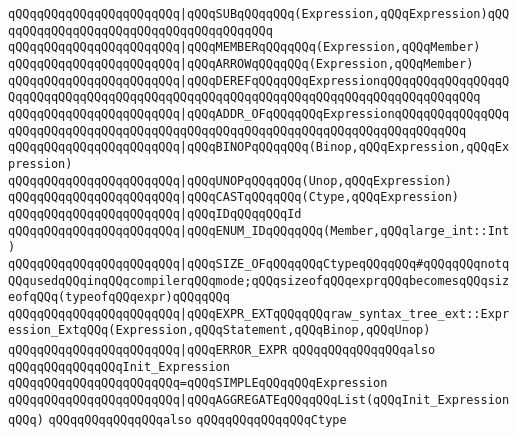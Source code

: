 \verb|qQQqqQQqqQQqqQQqqQQqqQQq|\verb#|qQQqSUBqQQqqQQq(Expression,qQQqExpression)qQQqqQQqqQQqqQQqqQQqqQQqqQQqqQQqqQQqqQQq#\newline
\verb|qQQqqQQqqQQqqQQqqQQqqQQq|\verb#|qQQqMEMBERqQQqqQQq(Expression,qQQqMember)#\newline
\verb|qQQqqQQqqQQqqQQqqQQqqQQq|\verb#|qQQqARROWqQQqqQQq(Expression,qQQqMember)#\newline
\verb|qQQqqQQqqQQqqQQqqQQqqQQq|\verb#|qQQqDEREFqQQqqQQqExpressionqQQqqQQqqQQqqQQqqQQqqQQqqQQqqQQqqQQqqQQqqQQqqQQqqQQqqQQqqQQqqQQqqQQqqQQqqQQqqQQqqQQq#\newline
\verb|qQQqqQQqqQQqqQQqqQQqqQQq|\verb#|qQQqADDR_OFqQQqqQQqExpressionqQQqqQQqqQQqqQQqqQQqqQQqqQQqqQQqqQQqqQQqqQQqqQQqqQQqqQQqqQQqqQQqqQQqqQQqqQQqqQQq#\newline
\verb|qQQqqQQqqQQqqQQqqQQqqQQq|\verb#|qQQqBINOPqQQqqQQq(Binop,qQQqExpression,qQQqExpression)#\newline
\verb|qQQqqQQqqQQqqQQqqQQqqQQq|\verb#|qQQqUNOPqQQqqQQq(Unop,qQQqExpression)#\newline
\verb|qQQqqQQqqQQqqQQqqQQqqQQq|\verb#|qQQqCASTqQQqqQQq(Ctype,qQQqExpression)#\newline
\verb|qQQqqQQqqQQqqQQqqQQqqQQq|\verb#|qQQqIDqQQqqQQqId#\newline
\verb|qQQqqQQqqQQqqQQqqQQqqQQq|\verb#|qQQqENUM_IDqQQqqQQq(Member,qQQqlarge_int::Int)#\newline
\verb|qQQqqQQqqQQqqQQqqQQqqQQq|\verb#|qQQqSIZE_OFqQQqqQQqCtypeqQQqqQQq#\verb|#qQQqqQQqnotqQQqusedqQQqinqQQqcompilerqQQqmode;qQQqsizeofqQQqexprqQQqbecomesqQQqsizeofqQQq(typeofqQQqexpr)qQQqqQQq|\newline
\verb|qQQqqQQqqQQqqQQqqQQqqQQq|\verb#|qQQqEXPR_EXTqQQqqQQqraw_syntax_tree_ext::Expression_ExtqQQq(Expression,qQQqStatement,qQQqBinop,qQQqUnop)#\newline
\verb|qQQqqQQqqQQqqQQqqQQqqQQq|\verb#|qQQqERROR_EXPR#\newline
\newline
\verb|qQQqqQQqqQQqqQQqalso|\newline
\verb|qQQqqQQqqQQqqQQqInit_Expression|\newline
\verb|qQQqqQQqqQQqqQQqqQQqqQQq=qQQqSIMPLEqQQqqQQqExpression|\newline
\verb|qQQqqQQqqQQqqQQqqQQqqQQq|\verb#|qQQqAGGREGATEqQQqqQQqList(qQQqInit_ExpressionqQQq)#\newline
\newline
\verb|qQQqqQQqqQQqqQQqalso|\newline
\verb|qQQqqQQqqQQqqQQqCtype|\newline
